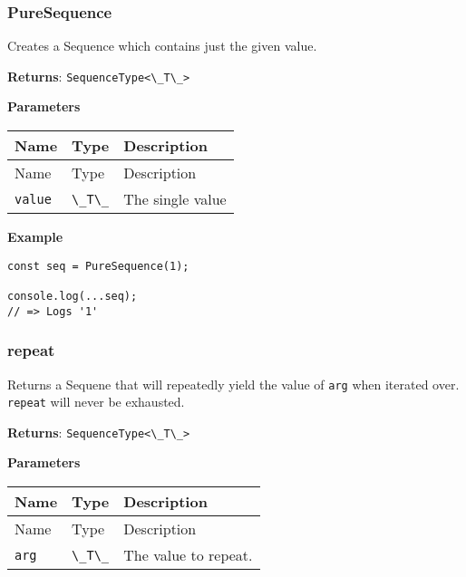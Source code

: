 \hypertarget{c35d49b1-5a40-4fb7-b9cd-225357873654}{%
\subsubsection{PureSequence}\label{c35d49b1-5a40-4fb7-b9cd-225357873654}}

Creates a Sequence which contains just the given value.

\textbf{Returns}: \passthrough{\lstinline!SequenceType<\_T\_>!}

\textbf{Parameters}

\begin{longtable}[]{
  >{\raggedright\arraybackslash}p{}
  >{\raggedright\arraybackslash}p{}
  >{\raggedright\arraybackslash}p{}@{}}

\toprule\noalign{}
Name & Type & Description \\
\midrule\noalign{}
\endfirsthead
\toprule\noalign{}
Name & Type & Description \\
\midrule\noalign{}
\endhead
\bottomrule\noalign{}
\endlastfoot
\passthrough{\lstinline!value!} & \passthrough{\lstinline!\_T\_!} & The
single value \\
\end{longtable}

\textbf{Example}

\begin{lstlisting}[label=2effd3f2-45c8-4259-a1bd-334cff141bed]
const seq = PureSequence(1);
                            
console.log(...seq);
// => Logs '1'
\end{lstlisting}

\hypertarget{f195d9e4-f348-46ee-9ddf-a56012126598}{%
\subsubsection{repeat}\label{f195d9e4-f348-46ee-9ddf-a56012126598}}

Returns a Sequene that will repeatedly yield the value of
\passthrough{\lstinline!arg!} when iterated over.
\passthrough{\lstinline!repeat!} will never be exhausted.

\textbf{Returns}: \passthrough{\lstinline!SequenceType<\_T\_>!}

\textbf{Parameters}

\begin{longtable}[]{
  >{\raggedright\arraybackslash}p{}
  >{\raggedright\arraybackslash}p{}
  >{\raggedright\arraybackslash}p{}@{}}

\toprule\noalign{}
Name & Type & Description \\
\midrule\noalign{}
\endfirsthead
\toprule\noalign{}
Name & Type & Description \\
\midrule\noalign{}
\endhead
\bottomrule\noalign{}
\endlastfoot
\passthrough{\lstinline!arg!} & \passthrough{\lstinline!\_T\_!} & The
value to repeat. \\
\end{longtable}

